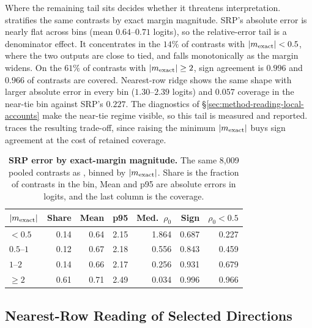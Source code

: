 Where the remaining tail sits decides whether it threatens
interpretation.  stratifies the same
contrasts by exact margin magnitude. SRP's absolute error is nearly flat
across bins (mean \(0.64\)--\(0.71\) logits), so the relative-error tail
is a denominator effect. It concentrates in the \(14\%\) of contrasts with
\(|m_{\mathrm{exact}}|<0.5\), where the two outputs are close to tied,
and falls monotonically as the margin widens. On the \(61\%\) of
contrasts with \(|m_{\mathrm{exact}}|\ge2\), sign agreement is \(0.996\)
and \(0.966\) of contrasts are covered. Nearest-row ridge shows the same
shape with larger absolute error in every bin
(\(1.30\)--\(2.39\) logits) and \(0.057\) coverage in the near-tie bin
against SRP's \(0.227\). The diagnostics of
\S\ref{sec:method-reading-local-accounts} make the near-tie regime
visible, so this tail is measured and reported.
 traces the resulting
trade-off, since raising the minimum \(|m_{\mathrm{exact}}|\) buys sign
agreement at the cost of retained coverage.

\begin{table}[!tbp]
\caption{\textbf{SRP error by exact-margin magnitude.} The same 8{,}009
pooled contrasts as , binned by
\(|m_{\mathrm{exact}}|\). Share is the fraction of contrasts in the bin,
Mean and p95 are absolute errors in logits, and the last column is the
coverage.}
\label{tab:app-error-tail-margins}
\centering
\footnotesize
\setlength{\tabcolsep}{3.6pt}
\renewcommand{\arraystretch}{1.08}
\begin{tabular}{@{}lrrrrrr@{}}
\toprule
\(|m_{\mathrm{exact}}|\) & Share & Mean & p95 & Med.\ \(\rho_0\) & Sign & \(\rho_0<0.5\) \\
\midrule
\(<0.5\) & 0.14 & 0.64 & 2.15 & 1.864 & 0.687 & 0.227 \\
\(0.5\)--\(1\) & 0.12 & 0.67 & 2.18 & 0.556 & 0.843 & 0.459 \\
\(1\)--\(2\) & 0.14 & 0.66 & 2.17 & 0.256 & 0.931 & 0.679 \\
\(\ge 2\) & 0.61 & 0.71 & 2.49 & 0.034 & 0.996 & 0.966 \\
\bottomrule
\end{tabular}
\end{table}

\subsection{Nearest-Row Reading of Selected Directions}
\label{app:nearest-rows}

